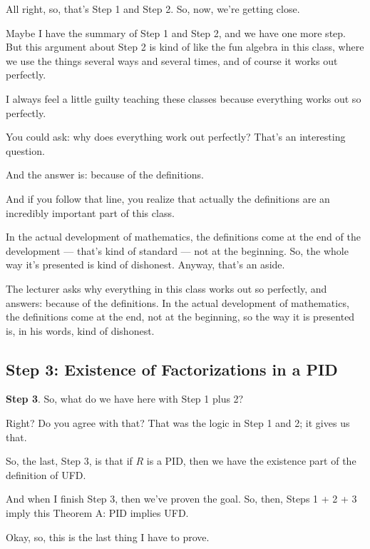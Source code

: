 \begin{speech}[00:56:32 - 00:57:42]
All right, so, that's Step 1 and Step 2. So, now, we're getting close. 

Maybe I have the summary of Step 1 and Step 2, and we have one more step. But this argument about Step 2 is kind of like the fun algebra in this class, where we use the things several ways and several times, and of course it works out perfectly.

I always feel a little guilty teaching these classes because everything works out so perfectly.

You could ask: why does everything work out perfectly? That's an interesting question.

And the answer is: because of the definitions.

And if you follow that line, you realize that actually the definitions are an incredibly important part of this class.

In the actual development of mathematics, the definitions come at the end of the development --- that's kind of standard --- not at the beginning. So, the whole way it's presented is kind of dishonest. Anyway, that's an aside.
\end{speech}

\begin{insight}
The lecturer asks why everything in this class works out so perfectly, and answers: because of the definitions. In the actual development of mathematics, the definitions come at the end, not at the beginning, so the way it is presented is, in his words, kind of dishonest.
\end{insight}

\subsection{Step 3: Existence of Factorizations in a PID}

\begin{speech}[00:57:42 - 00:59:02]
\textbf{Step 3}. So, what do we have here with Step 1 plus 2?

Right? Do you agree with that? That was the logic in Step 1 and 2; it gives us that.

So, the last, Step 3, is that if $R$ is a PID, then we have the existence part of the definition of UFD. 

And when I finish Step 3, then we've proven the goal. So, then, Steps 1 + 2 + 3 imply this Theorem A: PID implies UFD. 

Okay, so, this is the last thing I have to prove.
\end{speech}

